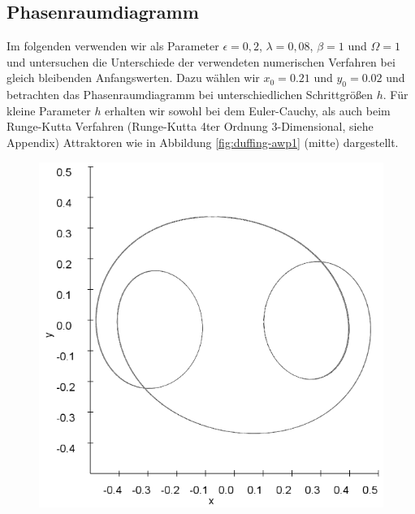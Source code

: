 \documentclass{scrartcl}
\begin{document}
\subsection { Phasenraumdiagramm }
Im folgenden verwenden wir als Parameter $\epsilon = 0,2$, $\lambda = 0,08$, $\beta = 1$ und $\Omega = 1$ und untersuchen die Unterschiede der verwendeten numerischen Verfahren bei gleich bleibenden Anfangswerten. Dazu wählen wir $x_0=0.21$ und $y_0=0.02$ und betrachten das Phasenraumdiagramm bei unterschiedlichen Schrittgrößen $h$. Für kleine Parameter $h$ erhalten wir sowohl bei dem Euler-Cauchy, als auch beim Runge-Kutta Verfahren (Runge-Kutta 4ter Ordnung 3-Dimensional, siehe Appendix) Attraktoren wie in Abbildung \ref{fig:duffing-awp1} (mitte) dargestellt. 
\begin{figure}[!htbp]
\includegraphics[scale=0.28]{duffing-awp1-500k-nach-500k-h0,1-euler}

\end{figure}
\end{document}
